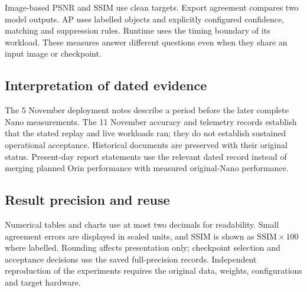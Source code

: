 Image-based PSNR and SSIM use clean targets. Export agreement compares two
model outputs. AP uses labelled objects and explicitly configured confidence,
matching and suppression rules. Runtime uses the timing boundary of its
workload. These measures answer different questions even when they share
an input image or checkpoint.

\subsection{Interpretation of dated evidence}
The 5 November deployment notes describe a period before the later complete
Nano measurements. The 11 November accuracy and telemetry records establish
that the stated replay and live workloads ran; they do not establish sustained
operational acceptance. Historical documents are preserved with their original
status. Present-day report statements use the relevant dated record instead
of merging planned Orin performance with measured original-Nano performance.

\subsection{Result precision and reuse}
Numerical tables and charts use at most two decimals for readability. Small
agreement errors are displayed in scaled units, and SSIM is shown as
$\mathrm{SSIM}\times100$ where labelled. Rounding affects presentation only;
checkpoint selection and acceptance decisions use the saved full-precision
records. Independent reproduction of the experiments requires the original
data, weights, configurations and target hardware.
